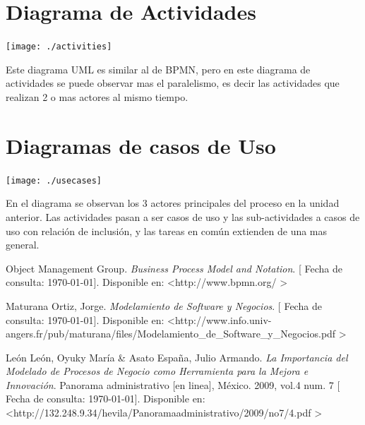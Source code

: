 \documentclass[spanish,12pt,letterpapper]{article}
\begin{document}
	
	\section{Diagrama de Actividades}
	\begin{center}
	\texttt{[image: ./activities]}~\\[1cm]
	\end{center}
	
	Este diagrama UML es similar al de BPMN, pero en este diagrama de actividades se puede observar mas el paralelismo, es decir las actividades que realizan 2 o mas actores al mismo tiempo.
	
	\section{Diagramas de casos de Uso}
	\begin{center}
	\texttt{[image: ./usecases]}~\\[1cm]
	\end{center}
	
	En el diagrama se observan los 3 actores principales del proceso en la unidad anterior. Las actividades pasan a ser casos de uso y las sub-actividades a casos de uso con relación de inclusión, y las tareas en común extienden de una mas general.
	
	
	
	
	\pagebreak
	\begin{thebibliography}{9}
	 Object Management Group. 
		\emph{Business Process Model and Notation}. {[} Fecha de consulta: \today {]}. Disponible en: \textless http://www.bpmn.org/ \textgreater	
	
		 Maturana Ortiz, Jorge. 
		\emph{Modelamiento de Software y Negocios}. {[} Fecha de consulta: \today {]}. Disponible en: \textless http://www.info.univ-angers.fr/pub/maturana/files/Modelamiento\_de\_Software\_y\_Negocios.pdf \textgreater
		
		 León León, Oyuky María \& Asato España, Julio Armando. 
		\emph{La Importancia del Modelado de Procesos de
			Negocio como Herramienta para la Mejora e
			Innovación}. Panorama administrativo {[}en linea{]}, México. 2009, vol.4 num. 7  {[} Fecha de consulta: \today {]}. Disponible en: \textless http://132.248.9.34/hevila/Panoramaadministrativo/2009/no7/4.pdf \textgreater
	\end{thebibliography}
\end{document}

